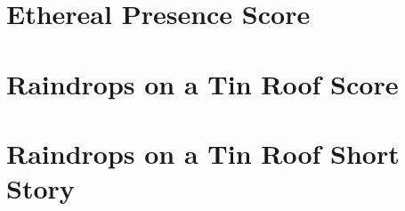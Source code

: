 

\chapter{Ethereal Presence Score}



\chapter{Raindrops on a Tin Roof Score}



\chapter{Raindrops on a Tin Roof Short Story}








\backmatter


